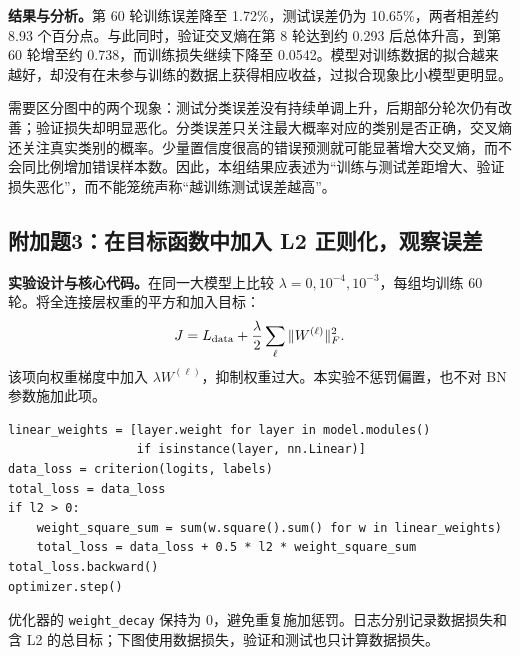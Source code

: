 \documentclass[UTF8,11pt,a4paper,fontset=fandol]{ctexart}
\newcommand{\question}[1]{\Needspace{14\baselineskip}\subsection{#1}}
\begin{document}
\textbf{结果与分析。}第 60 轮训练误差降至 1.72\%，测试误差仍为 10.65\%，两者相差约 8.93 个百分点。与此同时，验证交叉熵在第 8 轮达到约 0.293 后总体升高，到第 60 轮增至约 0.738，而训练损失继续下降至 0.0542。模型对训练数据的拟合越来越好，却没有在未参与训练的数据上获得相应收益，过拟合现象比小模型更明显。

需要区分图中的两个现象：测试分类误差没有持续单调上升，后期部分轮次仍有改善；验证损失却明显恶化。分类误差只关注最大概率对应的类别是否正确，交叉熵还关注真实类别的概率。少量置信度很高的错误预测就可能显著增大交叉熵，而不会同比例增加错误样本数。因此，本组结果应表述为“训练与测试差距增大、验证损失恶化”，而不能笼统声称“越训练测试误差越高”。

\question{附加题3：在目标函数中加入 L2 正则化，观察误差}
\textbf{实验设计与核心代码。}在同一大模型上比较 $\lambda=0,10^{-4},10^{-3}$，每组均训练 60 轮。将全连接层权重的平方和加入目标：
\begin{equation}
J=L_{\rm data}+\frac{\lambda}{2}\sum_{\ell}\|W^{(\ell)}\|_F^2.
\end{equation}
该项向权重梯度中加入 $\lambda W^{(\ell)}$，抑制权重过大。本实验不惩罚偏置，也不对 BN 参数施加此项。
\par\noindent\begin{minipage}{\linewidth}
\begin{lstlisting}
linear_weights = [layer.weight for layer in model.modules()
                  if isinstance(layer, nn.Linear)]
data_loss = criterion(logits, labels)
total_loss = data_loss
if l2 > 0:
    weight_square_sum = sum(w.square().sum() for w in linear_weights)
    total_loss = data_loss + 0.5 * l2 * weight_square_sum
total_loss.backward()
optimizer.step()
\end{lstlisting}
\end{minipage}\par
优化器的 \texttt{weight\_decay} 保持为 0，避免重复施加惩罚。日志分别记录数据损失和含 L2 的总目标；下图使用数据损失，验证和测试也只计算数据损失。
\end{document}
